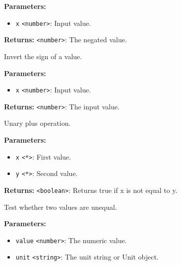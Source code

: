 \documentclass[12pt,a4paper]{article}
\begin{document}
\noindent \textbf{Parameters:}
\begin{itemize}
  \item \texttt{x} \texttt{<number>}: Input value.
\end{itemize}

\noindent \textbf{Returns:} \texttt{<number>}: The negated value.

\noindent Invert the sign of a value.

\vspace{5mm}
\noindent {}


\noindent \textbf{Parameters:}
\begin{itemize}
  \item \texttt{x} \texttt{<number>}: Input value.
\end{itemize}

\noindent \textbf{Returns:} \texttt{<number>}: The input value.

\noindent Unary plus operation.

\vspace{5mm}
\noindent {}


\noindent \textbf{Parameters:}
\begin{itemize}
  \item \texttt{x} \texttt{<*>}: First value.
  \item \texttt{y} \texttt{<*>}: Second value.
\end{itemize}

\noindent \textbf{Returns:} \texttt{<boolean>}: Returns true if x is not equal to y.

\noindent Test whether two values are unequal.

\vspace{5mm}
\noindent {}


\noindent \textbf{Parameters:}
\begin{itemize}
  \item \texttt{value} \texttt{<number>}: The numeric value.
  \item \texttt{unit} \texttt{<string>}: The unit string or Unit object.
\end{itemize}
\end{document}
